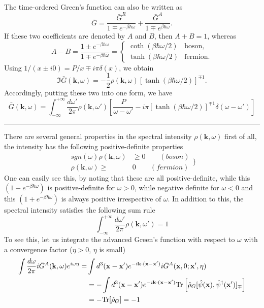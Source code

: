 The time-ordered Green's function can also be written as
\begin{equation}\tag{4.7.21'}
\bar G=\frac{\bar G^R}{1\mp e^{-\beta\hbar\omega}}+
\frac{\bar G^A}{1\mp e^{\beta\hbar\omega}}.
\end{equation}
If these two coefficients are denoted by $A$ and $B$, then $A+B=1$, whereas
\[A-B=\frac{1\pm e^{-\beta\hbar\omega}}{1\mp e^{-\beta\hbar\omega}}
=\begin{cases}\coth(\beta\hbar\omega/2)&\text{boson},\\
\tanh(\beta\hbar\omega/2)&\text{fermion}.\end{cases}\]
Using $1/(x\pm i0)=P/x\mp i\pi\delta(x)$, we obtain
\[\Im\bar G(\mathbf k,\omega)=-\frac{1}{2}\rho(\mathbf k,\omega)
[\tanh(\beta\hbar\omega/2)]^{\mp1}.\]
Accordingly, putting these two into one form, we have
\begin{equation}
\bar G(\mathbf{k},\omega) = \int_{-\infty}^{+\infty} \frac{d\omega'}{2\pi} \rho(\mathbf{k},\omega') \left[ \frac{P}{\omega-\omega'} -i\pi [\tanh (\beta\hbar\omega/2)]^{\mp1}\delta(\omega-\omega')\right]
\end{equation}
\rule{\textwidth}{0.2mm}
 There are several general properties in the spectral intensity $\rho(\mathbf{k},\omega)$
 first of all, the intensity has the following positive-definite properties
\begin{equation}
\begin{aligned}
sgn(\omega) \rho(\mathbf{k},\omega) &\ge 0 \qquad (boson)\\
\rho(\mathbf{k},\omega)\ge &0 \qquad (fermion)
\end{aligned}
\Big\}
\end{equation}
 One can easily see this, by noting that these are all positive-definite, while this $(1-e^{-\beta\hbar\omega})$ is positive-definite for $\omega>0$, while negative definite for $\omega<0$ and this $(1+e^{-\beta\hbar\omega})$ is always positive irrespective of $\omega$.
 In addition to this, the spectral intensity satisfies the following sum rule
\begin{equation}
\int_{-\infty}^{+\infty} \frac{d\omega'}{2\pi} \rho(\mathbf{k},\omega')=1
\end{equation}
 To see this, let us integrate the advanced Green's function with respect to $\omega$ with a convergence factor ($\eta>0$, $\eta$ is small)
\[
\begin{aligned}
\int \frac{d\omega}{2\pi} i\bar G ^A(\mathbf{k},\omega) e^{i\omega\eta}=&\int d^3 (\mathbf{x}-\mathbf{x}') e^{-i\mathbf{k}\cdot (\mathbf{x}-\mathbf{x}')} i\bar G^A(\mathbf{x},0;\mathbf{x}',\eta)\\
&=-\int d^3 (\mathbf{x}-\mathbf{x}') e^{-i\mathbf{k}\cdot (\mathbf{x}-\mathbf{x}')} \text{Tr} \left[ \hat \rho_G [\hat \psi (\mathbf x),\hat \psi ^\dag (\mathbf x')]_\mp \right]\\
&=-\text{Tr} [\hat \rho _G]=-1
\end{aligned}
\]
